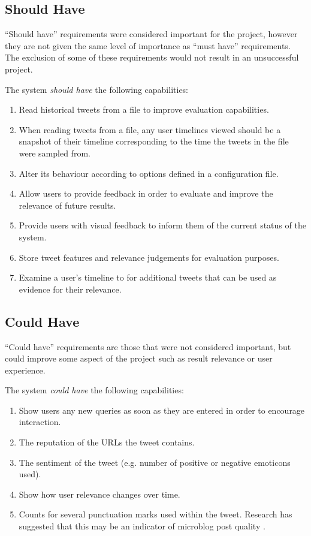 \documentclass{l4proj}
\begin{document}
        \subsection{Should Have}
        
        ``Should have'' requirements were considered important for the project, however they are not given the same level of importance as ``must have'' requirements. The exclusion of some of these requirements would not result in an unsuccessful project.
        
        The system \textit{should have} the following capabilities:
        
        \begin{enumerate}[label=\textbf{S.\arabic*}]
        \item Read historical tweets from a file to improve evaluation capabilities.
        \item When reading tweets from a file, any user timelines viewed should be a snapshot of their timeline corresponding to the time the tweets in the file were sampled from.
        \item Alter its behaviour according to options defined in a configuration file.
        \item Allow users to provide feedback in order to evaluate and improve the relevance of future results.
        \item Provide users with visual feedback to inform them of the current status of the system.
        \item Store tweet features and relevance judgements for evaluation purposes.
        \item Examine a user's timeline to for additional tweets that can be used as evidence for their relevance.
        \end{enumerate}

        \subsection{Could Have}
        ``Could have'' requirements are those that were not considered important, but could improve some aspect of the project such as result relevance or user experience.
        
        The system \textit{could have} the following capabilities:
        
        \begin{enumerate}[label=\textbf{C.\arabic*}]
        \item Show users any new queries as soon as they are entered in order to encourage interaction.
        \item The reputation of the URLs the tweet contains.
        \item The sentiment of the tweet (e.g. number of positive or negative emoticons used).
        \item Show how user relevance changes over time.
        \item Counts for several punctuation marks used within the tweet. Research has suggested that this may be an indicator of microblog post quality \cite{Vosecky2012}.
        \end{enumerate}
        
\end{document}
